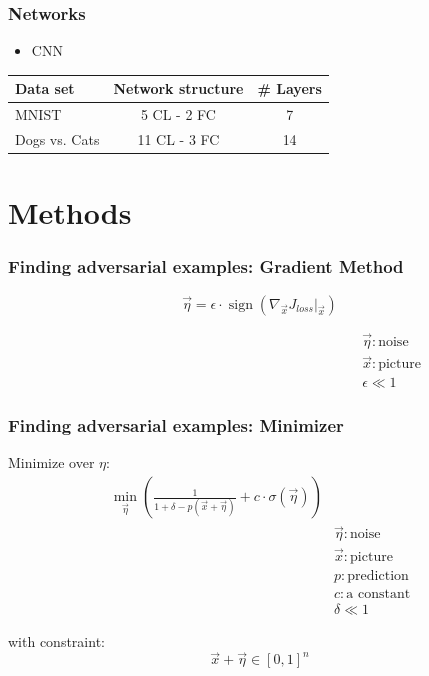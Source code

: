 \documentclass[handout]{beamer}
\begin{document}
\begin{frame}
\frametitle{Networks}
\begin{itemize}
\item CNN
\end{itemize}
\begin{table}
\centering
\begin{tabular}{l c c} 
\toprule
Data set & Network structure & \# Layers \\ 
\midrule
MNIST & 5 CL - 2 FC & 7 \\  
Dogs vs. Cats & 11 CL - 3 FC & 14 \\
\bottomrule 
\end{tabular} 
\end{table}
\end{frame}

\section{Methods}

\begin{frame}
\frametitle{Finding adversarial examples: Gradient Method}

\begin{equation*}
\vec{\eta} = \epsilon \cdot \operatorname{sign} \left( \nabla_{\vec{x}} J_{loss} \big \vert_{\vec{x}} \right) 
\end{equation*}

\begin{align*}
\hspace{18em} &\vec{\eta}: \text{noise} \\
\hspace{18em} &\vec{x}: \text{picture} \\
\hspace{18em} &\epsilon \ll 1 
\end{align*}

\end{frame}

\begin{frame}
\frametitle{Finding adversarial examples: Minimizer}

Minimize over $\eta$:
\begin{align*}
\min_{\vec{\eta}} \left(\frac{1}{1 + \delta - p(\vec{x}+\vec{\eta})} + c \cdot \sigma(\vec{\eta}) \right) & \\
&\vec{\eta}: \text{noise} \\
&\vec{x}: \text{picture} \\
&p: \text{prediction} \\
&c: \text{a constant} \\
&\delta \ll 1 
\end{align*}

with constraint:
\begin{equation*}
\vec{x}+\vec{\eta}\in [0,1]^n
\end{equation*}


\end{frame}
\end{document}
